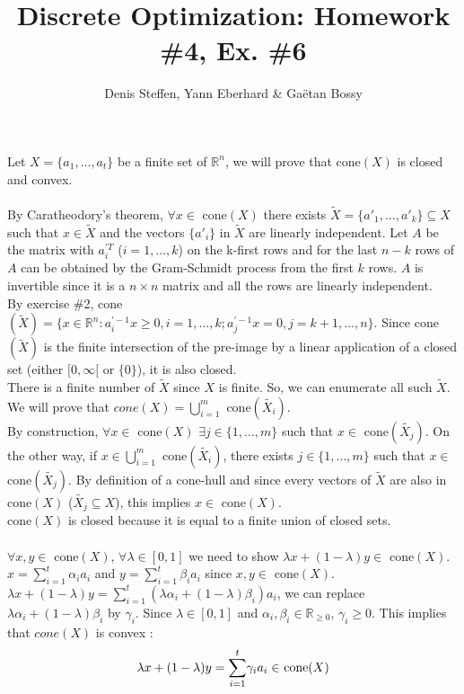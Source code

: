 \documentclass[a4paper,11pt,french]{article}
\title{Discrete Optimization: Homework \#4, Ex. \#6}
\author{Denis Steffen, Yann Eberhard \& Gaëtan Bossy}
\begin{document}
    
    \maketitle
    Let $X=\{ a_{1}, ... , a_{t}\}$ be a finite set of $\mathbb{R}^{n}$, we will prove that cone$(X)$ is closed and convex.
    \\
    \\
    By Caratheodory's theorem, $\forall x \in$ cone$(X)$ there exists $\widetilde{X}=\{ a'_{1}, ... , a'_{k}\} \subseteq X$ such that $x \in \widetilde{X}$ and the vectors $\{ a'_{i}\}$ in $\widetilde{X}$ are linearly independent. 
    Let $A$ be the matrix with $a_{i}^{\prime T}$ ($i=1, ... , k$) on the k-first rows and for the last $n-k$ rows of $A$ can be obtained by the Gram-Schmidt process from the first $k$ rows. $A$ is invertible since it is a $n \times n$ matrix and all the rows are linearly independent.
    \\
    By exercise \#2, cone$(\widetilde{X})=\{ x\in \mathbb{R}^{n} : a_{ i}^{\prime -1}x \geq 0, i=1, ... , k ; a_{j}^{\prime -1}x = 0, j=k+1, ... , n  \}$.
    Since cone$(\widetilde{X})$ is the finite intersection of the pre-image by a linear application of a closed set (either $[0, \infty[$ or $\{0\}$), it is also closed. 
    \\
    There is a finite number of $\widetilde{X}$ since $X$ is finite. So, we can enumerate all such $\widetilde{X}$. We will prove that $cone(X)=\displaystyle{\bigcup_{ i=1}^{m}}$ cone$(\widetilde{X_{i}})$. 
    \\
    By construction, $\forall x \in$ cone$(X)$ $\exists j \in \{1, ..., m\}$ such that $x \in$ cone$(\widetilde{X_{j}})$. On the other way, if $x \in \displaystyle{\bigcup_{ i=1}^{m}}$ cone$(\widetilde{X_{i}})$, there exists $j \in \{1, ... , m \}$ such that $x \in$ cone$(\widetilde{X_{j}})$. 
    By definition of a cone-hull and since every vectors of $\widetilde{X}$ are also in cone$(X)$ ($\widetilde{X_{j}} \subseteq X$), this implies $x \in$ cone$(X)$.
    \\
    cone$(X)$ is closed because it is equal to a finite union of closed sets.
    \\
    \\
    $\forall x, y \in$ cone$(X)$, $\forall \lambda \in [0,1]$ we need to show $\lambda 
    x +(1-\lambda)y \in$ cone$(X)$. $x=\displaystyle{\sum_{i=1}^{t}} \alpha_{i} a_{i}$ and $y=\displaystyle{\sum_{i=1}^{t}} \beta_{i} a_{i}$ since $x,y \in$ cone$(X)$.
    \\
    $\lambda x +(1-\lambda)y = \displaystyle{\sum_{i=1}^{t}} (\lambda \alpha_{i} + (1-\lambda)\beta_{i}) a_{i}$, we can replace $\lambda \alpha_{i} + (1-\lambda)\beta_{i}$ by $\gamma_{i}$. Since $\lambda \in [0,1]$ and $\alpha_{i}, \beta_{i} \in \mathbb{R}_{\geq 0}$, $\gamma_{i} \geq 0$. This implies that $cone(X)$ is convex :
    \begin{equation*}
    \lambda x +(1-\lambda)y = \displaystyle{\sum_{i=1}^{t}} \gamma_{i} a_{i} \in$ cone$(X)
    \end{equation*}
    
    
    
\end{document}
